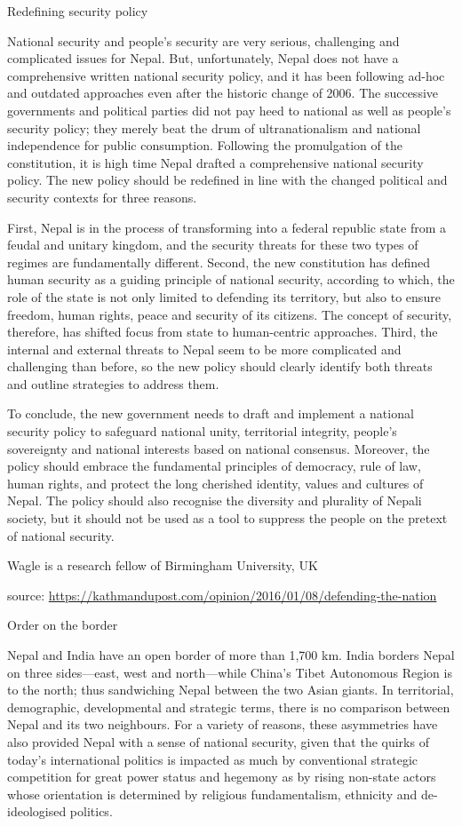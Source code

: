 \documentclass[
  openany]{book}
\begin{document}
Redefining security policy

National security and people's security are very serious, challenging and complicated issues for Nepal. But, unfortunately, Nepal does not have a comprehensive written national security policy, and it has been following ad-hoc and outdated approaches even after the historic change of 2006. The successive governments and political parties did not pay heed to national as well as people's security policy; they merely beat the drum of ultranationalism and national independence for public consumption. Following the promulgation of the constitution, it is high time Nepal drafted a comprehensive national security policy. The new policy should be redefined in line with the changed political and security contexts for three reasons.

First, Nepal is in the process of transforming into a federal republic state from a feudal and unitary kingdom, and the security threats for these two types of regimes are fundamentally different. Second, the new constitution has defined human security as a guiding principle of national security, according to which, the role of the state is not only limited to defending its territory, but also to ensure freedom, human rights, peace and security of its citizens. The concept of security, therefore, has shifted focus from state to human-centric approaches. Third, the internal and external threats to Nepal seem to be more complicated and challenging than before, so the new policy should clearly identify both threats and outline strategies to address them.

To conclude, the new government needs to draft and implement a national security policy to safeguard national unity, territorial integrity, people's sovereignty and national interests based on national consensus. Moreover, the policy should embrace the fundamental principles of democracy, rule of law, human rights, and protect the long cherished identity, values and cultures of Nepal. The policy should also recognise the diversity and plurality of Nepali society, but it should not be used as a tool to suppress the people on the pretext of national security.

Wagle is a research fellow of Birmingham University, UK

source: \url{https://kathmandupost.com/opinion/2016/01/08/defending-the-nation}

Order on the border

Nepal and India have an open border of more than 1,700 km. India borders Nepal on three sides---east, west and north---while China's Tibet Autonomous Region is to the north; thus sandwiching Nepal between the two Asian giants. In territorial, demographic, developmental and strategic terms, there is no comparison between Nepal and its two neighbours. For a variety of reasons, these asymmetries have also provided Nepal with a sense of national security, given that the quirks of today's international politics is impacted as much by conventional strategic competition for great power status and hegemony as by rising non-state actors whose orientation is determined by religious fundamentalism, ethnicity and de-ideologised politics.
\end{document}
